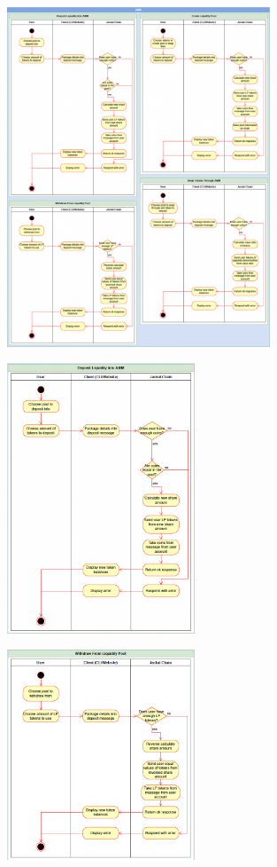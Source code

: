 \documentclass[a4paper]{article}
\begin{document}
\begin{figure}[!htbp]
\centering
\includegraphics[width=0.7\textwidth]{assets/lp1.png}
\end{figure}

\begin{figure}[!htbp]
\centering
\includegraphics[width=0.5\textwidth]{assets/lp2.png}
\end{figure}

\begin{figure}[!htbp]
\centering
\includegraphics[width=0.5\textwidth]{assets/lp3.png}
\end{figure}
\end{document}
